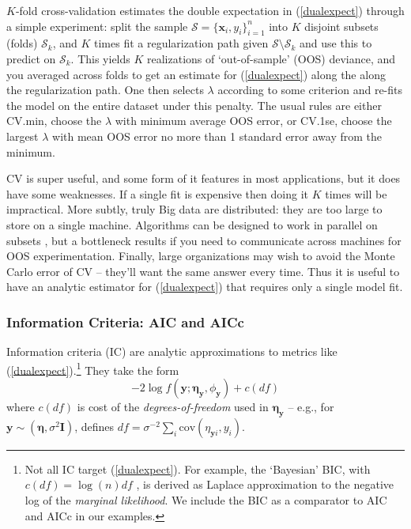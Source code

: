 \documentclass[12pt]{article}
\newcommand{\bs}[1]{\boldsymbol{#1}}
\newcommand{\mc}[1]{\mathcal{#1}}
\newcommand{\mr}[1]{\mathrm{#1}}
\newcommand{\bm}[1]{\mathbf{#1}}
\begin{document}
$K$-fold cross-validation \cite[CV; see][for an
overview]{efron_estimation_2004} estimates the double expectation in
(\ref{dualexpect}) through a simple experiment: split the sample $\mc{S} =
\{\bm{x}_i,y_i\}_{i=1}^n$ into $K$  disjoint subsets (folds) $\mc{S}_k$,
and $K$ times fit a regularization path given $\mc{S} \setminus \mc{S}_k$ and
use this to predict on $\mc{S}_k$.  This yields $K$  realizations of
`out-of-sample' (OOS) deviance, and you averaged across folds to get an
estimate for (\ref{dualexpect}) along the along the regularization path. One then selects $\lambda$ according to some criterion and re-fits the
model on the entire dataset under this penalty.  The usual rules are either
CV.min, choose the $\lambda$ with minimum average OOS error, or
CV.1se, choose the largest $\lambda$ with mean OOS error no more than
1 standard error away from the minimum. 

CV is super useful, and some form of it features in most applications, but it
does have some weaknesses. If a single fit is expensive then doing it $K$
times will be impractical.  More subtly, truly Big data are distributed: they
are too large to store on a single machine. Algorithms can be designed to work
in parallel on subsets
\citep[e.g.,][]{taddy_distributed_2013}, but a bottleneck
results if you need to communicate across machines for OOS experimentation.
Finally, large organizations may wish to avoid the
Monte Carlo error of CV -- they'll want the same answer every time.  Thus it
is useful to have an analytic estimator for (\ref{dualexpect}) that requires only  a single model fit.


\subsubsection{Information Criteria: AIC and AICc}


Information criteria (IC) are analytic approximations to metrics like
(\ref{dualexpect}).\footnote{Not all IC target (\ref{dualexpect}).  For
example, the `Bayesian' BIC, with  $c(df) =\log(n)df$
\citep{schwarz_estimating_1978}, is derived
\citep{kass_bayes_1995} as Laplace approximation to the negative log of the
 {\it marginal likelihood}.  We include the BIC as a comparator to AIC and
 AICc in our examples. }  They take the form
\begin{equation}\label{ic}
 -2\log f(\bm{y}; \bs{\eta}_{\bm{y}},\phi_{\bm{y}}) + c(df)
 \end{equation} 
where $c(df)$ is cost of the {\it degrees-of-freedom} used in
$\bs{\eta}_{\bm{y}}$ -- e.g., for $\bm{y} \sim (\bs{\eta},\sigma^2\bm{I})$,
\citet{efron_least_2004} defines $df =
\sigma^{-2} \sum_i \mr{cov}(\eta_{\bm{y}i}, y_i)$. 
\end{document}
